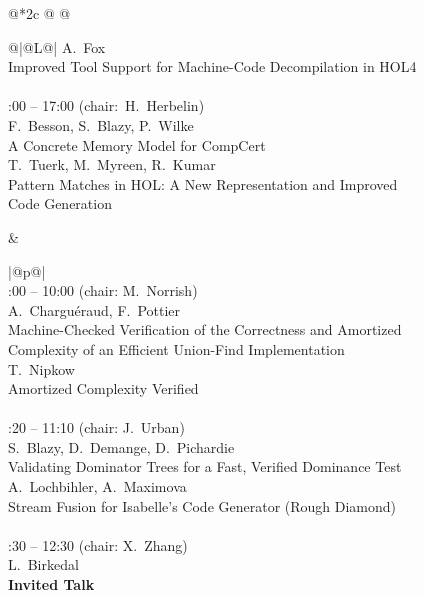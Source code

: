 \documentclass[11pt]{report}
\begin{document}
\begin{figure}[p]
\begin{center}
{\begin{tabular}[t]{@{}*{2}{c @{\hspace{4mm}}} @{}}
\begin{tabular}[t]{@{}|@{\hspace{0.5mm}}L{\cw}@{\hspace{0.5mm}}|}
  A.~Fox\\ 
  Improved Tool Support for Machine-Code Decompilation in 
  HOL4\\
  \hline
  \\
  :00 -- 17:00 (chair:~H.~Herbelin)\smallskip\\
  F.~Besson, S.~Blazy, P.~Wilke\\ 
  A Concrete Memory Model for CompCert\smallskip\\
  T.~Tuerk, M.~Myreen, R.~Kumar\\
  Pattern Matches in HOL: A New Representation and Improved Code 
  Generation\\
  \hline
  \end{tabular} 
& \begin{tabular}[t]{|@{\hspace{0.5mm}}p{\cw}@{\hspace{0.5mm}}|}
  \\
  :00 -- 10:00 (chair: M.~Norrish)\smallskip\\
  A.~Charguéraud, F.~Pottier\\
  Machine-Checked Verification of the Correctness and Amortized Complexity of an Efficient Union-Find 
  Implementation\smallskip\\
  T.~Nipkow\\ 
  Amortized Complexity Verified\\
  \hline
  \\
  :20 -- 11:10 (chair: J.~Urban)\smallskip\\
  S.~Blazy, D.~Demange, D.~Pichardie\\
  Validating Dominator Trees for a Fast, Verified Dominance 
  Test\smallskip\\
  A.~Lochbihler, A.~Maximova\\
  Stream Fusion for Isabelle'{}s Code Generator (Rough 
  Diamond)\\
  \hline
  \\
  :30 -- 12:30 (chair: X.~Zhang)\smallskip\\
  L.~Birkedal\\
  \textbf{Invited Talk}\\

\end{tabular}
\end{tabular}}
\end{center}
\end{figure}
\end{document}
